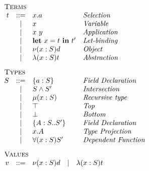\begin{minipage}[t]{.5\textwidth}\[\begin{array}{r c l l}
    \multicolumn{4}{l}{\textsc{Terms}}                        \\
    t & ::= & x.a             & \textit{Selection           } \\
      &  |  & x               & \textit{Variable            } \\
      &  |  & x\ y            & \textit{Application         } \\
      &  |  & \LET{x}{t}{t'}  & \textit{Let-binding         } \\
      &  |  & \OBJ{x}{S}{d}   & \textit{Object              } \\
      &  |  & \ABS{x}{S}{t}   & \textit{Abstraction         } \\[3mm]
    \multicolumn{4}{l}{\textsc{Types}}                        \\
    S & ::= & \FDEC{a}{S}     & \textit{Field Declaration   } \\
      &  |  & \AGG{S}{S'}     & \textit{Intersection        } \\
      &  |  & \REC{x}{S}      & \textit{Recursive type      } \\
      &  |  & \top            & \textit{Top                 } \\
      &  |  & \bot            & \textit{Bottom              } \\
      &  |  & \TDEC{A}{S}{S'} & \textit{Field Declaration   } \\
      &  |  & x.A             & \textit{Type Projection     } \\
      &  |  & \DFUN{x}{S}{S'} & \textit{Dependent Function  } \\[3mm]
    \multicolumn{4}{l}{\textsc{Values}} \\
    v & ::= & \multicolumn{2}{l}{\OBJ{x}{S}{d}
        \quad | \quad \ABS{x}{S}{t}} \\[3mm]
\end{array}\]\end{minipage}
